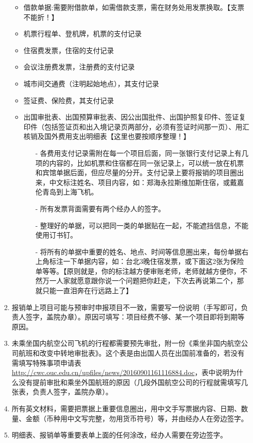 \documentclass{article}
\begin{document}
\begin{enumerate}
\begin{itemize}
\item 借款单据:需要附借款单，如需借款支票，需在财务处用发票换取。【支票不能折！】
\item 机票行程单、登机牌，机票的支付记录
\item 住宿费发票，住宿的支付记录
\item 会议注册费发票，注册费的支付记录
\item 城市间交通费（注明起始地点），其支付记录
\item 签证费、保险费，其支付记录
\item 出国审批表、出国预算审批表、因公出国批件、出国护照复印件、签证复印件（包括签证页和出入境记录页两部分，必须有签证时间那一页）、用汇核销及国外费用支出明细表【这里也要按顺序整理！】
\begin{itemize}
\item[-] 各费用支付记录需附在每一个项目后面，同一张银行支付记录上有几项的内容的，比如机票和住宿都在同一张记录上，可以统一放在机票和宾馆单据后面，但应尽量的分开。支付记录上要将报销的项目圈出来，中文标注姓名、项目内容，如：郑海永拉斯维加斯住宿，或戴嘉伦青岛到上海飞机。
\item[-] 所有发票背面需要有两个经办人的签字。
\item[-] 整理好的单据，可以把同一类的单据贴在一起，不能遮挡信息，不能使用订书钉。
\item[-] 将所有的单据中重要的姓名、地点、时间等信息圈出来，每份单据右上角标注一下单据内容，如：台北3晚住宿发票，或下面这2张为保险单等等。【原则就是，你的标注越方便审账老师，老师就越方便你，不然万一人家就愿意跟你说一个问题把你赶走，下次去再说第二个，那就只能一直泪奔在行远路上了】
\end{itemize}
\end{itemize}
\item 报销单上项目可能与预审时申报项目不一致，需要写一份说明（手写即可，负责人签字，盖院办章）。原因可填写：项目经费不够、某一个项目即将到期等原因。
\item 未乘坐国内航空公司飞机的行程都需要预先审批，附一份《乘坐非国内航空公司航班和改变中转地审批表》。这个表是由出国人员在出国前准备的，若没有需填写特殊事项申请表\url{http://cwc.ouc.edu.cn/upfiles/news/20160901161116884.doc}，表中说明为什么没有提前审批和乘坐外国航班的原因（几段外国航空公司的行程就需填写几张表，负责人签字，盖院办章）。
\item 所有英文材料，需要把票据上重要信息圈出，用中文手写票据内容、日期、数量、金额（币种用中文写完整，勿用货币符号）等，并由经办人在旁边签字。
\item 明细表、报销单等重要表单上面的任何涂改，经办人需要在旁边签字。
\end{enumerate}
\end{document}
